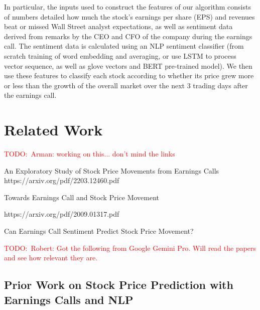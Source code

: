 \documentclass{article}
\newcommand{\TODO}[1]{\textcolor{red}{{TODO:~#1}}}
\newif\ifshowInstructions
\newcommand{\instructions}[1]{%
    \ifshowInstructions%
        \textcolor{violet}{#1}%
    \fi%
}
\begin{document}
In particular, the inputs used to construct the features of our algorithm consists of numbers detailed how much the stock's earnings per share (EPS) and revenues beat or missed Wall Street analyst expectations, as well as sentiment data derived from remarks by the CEO and CFO of the company during the earnings call.
The sentiment data is calculated using an NLP sentiment classifier (from scratch training of word embedding and averaging, or use LSTM to process vector sequence, as well as glove vectors and BERT pre-trained model).
We then use these features to classify each stock according to whether its price grew more or less than the growth of the overall market over the next 3 trading days after the earnings call.


\section{Related Work\instructions{{} | 0.5 page | WIP }}
\instructions{%
You should find existing papers, group them into categories based on their approaches, and discuss their strengths and weaknesses, as well as how they are similar to and differ from your work. In your opinion, which approaches were clever/good? What is the state- of-the-art? Do most people perform the task by hand? You should aim to have at least 5 references in the related work. Include previous attempts by others at your problem, previous technical methods, or previous learning algorithms. Google Scholar is very useful for this: https://scholar.google.com/ (you can click “cite” and it generates MLA, APA, BibTeX, etc.)
}

\TODO{Arman: working on this... don't mind the links}

An Exploratory Study of Stock Price Movements from Earnings
Calls
https://arxiv.org/pdf/2203.12460.pdf

Towards Earnings Call and Stock Price Movement

https://arxiv.org/pdf/2009.01317.pdf

Can Earnings Call Sentiment Predict Stock Price Movement?



\TODO{Robert: Got the following from Google Gemini Pro. Will read the papers and see how relevant they are.}

\subsection{Prior Work on Stock Price Prediction with Earnings Calls and
NLP}\label{prior-work-on-stock-price-prediction-with-earnings-calls-and-nlp}
\end{document}
